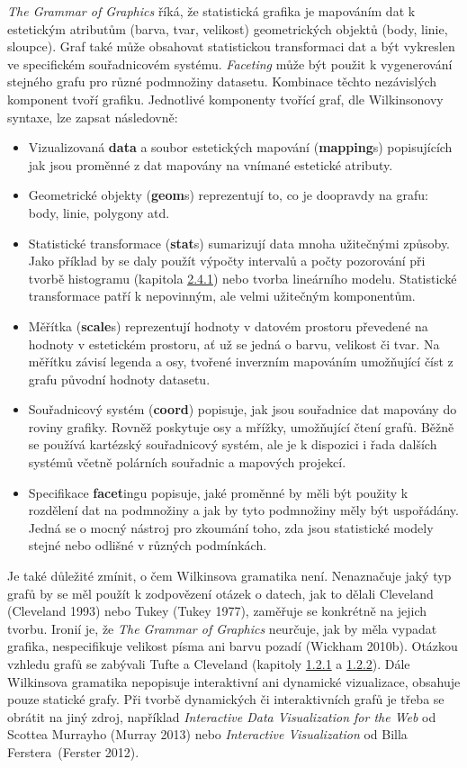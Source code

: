 \documentclass[12pt,]{article}
\providecommand{\tightlist}{%
  \setlength{\itemsep}{0pt}\setlength{\parskip}{0pt}}
\begin{document}
\qquad \textit{The Grammar of Graphics} říká, že statistická grafika je
mapováním dat k estetickým atributům (barva, tvar, velikost)
geometrických objektů (body, linie, sloupce). Graf také může obsahovat
statistickou transformaci dat a být vykreslen ve specifickém
souřadnicovém systému. \emph{Faceting} může být použit k vygenerování
stejného grafu pro různé podmnožiny datasetu. Kombinace těchto
nezávislých komponent tvoří grafiku. Jednotlivé komponenty tvořící graf,
dle Wilkinsonovy syntaxe, lze zapsat následovně:

\begin{itemize}
\tightlist
\item
  Vizualizovaná \textbf{data} a soubor estetických mapování
  (\textbf{mapping}s) popisujících jak jsou proměnné z dat mapovány na
  vnímané estetické atributy.
\item
  Geometrické objekty (\textbf{geom}s) reprezentují to, co je doopravdy
  na grafu: body, linie, polygony atd.
\item
  Statistické transformace (\textbf{stat}s) sumarizují data mnoha
  užitečnými způsoby. Jako příklad by se daly použít výpočty intervalů a
  počty pozorování při tvorbě histogramu (kapitola
  \protect\hyperlink{hist}{2.4.1}) nebo tvorba lineárního modelu.
  Statistické transformace patří k nepovinným, ale velmi užitečným
  komponentům.
\item
  Měřítka (\textbf{scale}s) reprezentují hodnoty v datovém prostoru
  převedené na hodnoty v estetickém prostoru, ať už se jedná o barvu,
  velikost či tvar. Na měřítku závisí legenda a osy, tvořené inverzním
  mapováním umožňující číst z grafu původní hodnoty datasetu.
\item
  Souřadnicový systém (\textbf{coord}) popisuje, jak jsou souřadnice dat
  mapovány do roviny grafiky. Rovněž poskytuje osy a mřížky, umožňující
  čtení grafů. Běžně se používá kartézský souřadnicový systém, ale je k
  dispozici i řada dalších systémů včetně polárních souřadnic a mapových
  projekcí.
\item
  Specifikace \textbf{facet}ingu popisuje, jaké proměnné by měli být
  použity k rozdělení dat na podmnožiny a jak by tyto podmnožiny měly
  být uspořádány. Jedná se o mocný nástroj pro zkoumání toho, zda jsou
  statistické modely stejné nebo odlišné v různých podmínkách.
\end{itemize}

\qquad Je také důležité zmínit, o čem Wilkinsova gramatika není.
Nenaznačuje jaký typ grafů by se měl použít k zodpovězení otázek o
datech, jak to dělali Cleveland (Cleveland 1993) nebo Tukey (Tukey
1977), zaměřuje se konkrétně na jejich tvorbu. Ironií je, že
\textit{The Grammar of Graphics} neurčuje, jak by měla vypadat grafika,
nespecifikuje velikost písma ani barvu pozadí (Wickham 2010b). Otázkou
vzhledu grafů se zabývali Tufte a Cleveland (kapitoly
\protect\hyperlink{tufte}{1.2.1} a
\protect\hyperlink{cleveland}{1.2.2}). Dále Wilkinsova gramatika
nepopisuje interaktivní ani dynamické vizualizace, obsahuje pouze
statické grafy. Při tvorbě dynamických či interaktivních grafů je třeba
se obrátit na jiný zdroj, například \emph{Interactive Data Visualization
for the Web} od Scottea Murrayho (Murray 2013) nebo \emph{Interactive
Visualization} od Billa Ferstera~(Ferster 2012).
\end{document}
